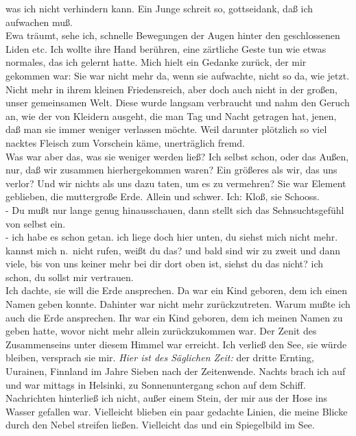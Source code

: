 \documentclass[
]{article}
\begin{document}
was ich nicht verhindern kann. Ein Junge schreit so, gottseidank, daß
ich aufwachen muß.\\
Ewa träumt, sehe ich, schnelle Bewegungen der Augen hinter den
geschlossenen Liden etc. Ich wollte ihre Hand berühren, eine zärtliche
Geste tun wie etwas normales, das ich gelernt hatte. Mich hielt ein
Gedanke zurück, der mir gekommen war: Sie war nicht mehr da, wenn sie
aufwachte, nicht so da, wie jetzt. Nicht mehr in ihrem kleinen
Friedensreich, aber doch auch nicht in der großen, unser gemeinsamen
Welt. Diese wurde langsam verbraucht und nahm den Geruch an, wie der von
Kleidern ausgeht, die man Tag und Nacht getragen hat, jenen, daß man sie
immer weniger verlassen möchte. Weil darunter plötzlich so viel nacktes
Fleisch zum Vorschein käme, unerträglich fremd.\\
Was war aber das, was sie weniger werden ließ? Ich selbst schon, oder
das Außen, nur, daß wir zusammen hierhergekommen waren? Ein größeres als
wir, das uns verlor? Und wir nichts als uns dazu taten, um es zu
vermehren? Sie war Element geblieben, die muttergroße Erde. Allein und
schwer. Ich: Kloß, sie Schooss.\\
- Du mußt nur lange genug hinausschauen, dann stellt sich das
Sehnsuchtsgefühl von selbst ein.\\
- ich habe es schon getan. ich liege doch hier unten, du siehst mich
nicht mehr. kannst mich n.~nicht rufen, weißt du das? und bald sind wir
zu zweit und dann viele, bis von uns keiner mehr bei dir dort oben ist,
siehst du das nicht? ich schon, du sollst mir vertrauen.\\
Ich dachte, sie will die Erde ansprechen. Da war ein Kind geboren, dem
ich einen Namen geben konnte. Dahinter war nicht mehr zurückzutreten.
Warum mußte ich auch die Erde ansprechen. Ihr war ein Kind geboren, dem
ich meinen Namen zu geben hatte, wovor nicht mehr allein zurückzukommen
war. Der Zenit des Zusammenseins unter diesem Himmel war erreicht. Ich
verließ den See, sie würde bleiben, versprach sie mir. \emph{Hier ist
des Säglichen Zeit: }der dritte Ernting, Uurainen, Finnland im Jahre
Sieben nach der Zeitenwende. Nachts brach ich auf und war mittags in
Helsinki, zu Sonnenuntergang schon auf dem Schiff. Nachrichten
hinterließ ich nicht, außer einem Stein, der mir aus der Hose ins Wasser
gefallen war. Vielleicht blieben ein paar gedachte Linien, die meine
Blicke durch den Nebel streifen ließen. Vielleicht das und ein
Spiegelbild im See.
\end{document}
